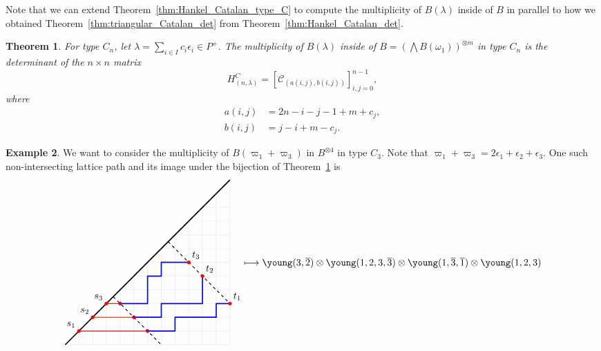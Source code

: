 \documentclass[11pt, leqno]{amsart}
\theoremstyle{plain}
\newtheorem{theorem}{Theorem}[section]
\theoremstyle{definition}
\newtheorem{example}[theorem]{Example}
\numberwithin{equation}{section}
\newcommand{\fw}{\varpi} %
\newcommand{\Cat}{\mathcal{C}} %
\newcommand{\othree}{\overline{3}}
\newcommand{\otwo}{\overline{2}}
\newcommand{\one}{\overline{1}}
\newcommand{\dyckgrid}[1]{
\foreach \i in {0, ..., #1} {\draw[gray!40, very thin] (\i,\i) -- (#1, \i); \draw[gray!40, very thin] (\i,\i) -- (\i, 0);}
}
\begin{document}
Note that we can extend Theorem~\ref{thm:Hankel_Catalan_type_C} to compute the multiplicity of $B(\lambda)$ inside of $B$ in parallel to how we obtained Theorem~\ref{thm:triangular_Catalan_det} from Theorem~\ref{thm:Hankel_Catalan_det}.

\begin{theorem}
\label{thm:triangular_Catalan_det_type_C}
For type $C_n$, let $\lambda = \sum_{i \in I} c_i \epsilon_i \in P^+$.
The multiplicity of $B(\lambda)$ inside of $B = \left( \bigwedge B(\omega_1) \right)^{\otimes m}$ in type $C_n$ is the determinant of the $n \times n$ matrix
\[
H^C_{(n,\lambda)} = \left[ \Cat_{(a(i,j),b(i,j))} \right]_{i,j=0}^{n-1},
\]
where
\begin{align*}
a(i,j) & = 2n - i - j - 1 + m + c_j,
\\ b(i,j) & = j - i + m - c_j.
\end{align*}
\end{theorem}

\begin{example}
We want to consider the multiplicity of $B(\fw_1+\fw_3)$ in $B^{\otimes 4}$ in type $C_3$. Note that $\fw_1 + \fw_3 = 2\epsilon_1 + \epsilon_2 + \epsilon_3$. One such non-intersecting lattice path and its image under the bijection of Theorem~\ref{thm:triangular_Catalan_det_type_C} is
\[
\begin{tikzpicture}[scale=0.5, baseline=82]
\dyckgrid{12}
\draw[very thick, blue, line join=round] (4,3) -- (6,3) -- (6,5) -- (7,5) -- (7,6) -- (9,6);
\draw[very thick, blue, line join=round] (5,2) -- (7,2) -- (7,3) -- (10,3) -- (10,5);
\draw[very thick, blue, line join=round] (6,1) -- (8,1) -- (8,2) -- (11,2) -- (11,3) -- (12,3);
\draw[very thick,-] (0,0) -- (12,12);
\draw[thick,dashed] (3.5,3.5) -- +(3.5, -3.5);
\draw[thick,dashed] (7.5,7.5) -- +(4.5, -4.5);
\foreach \i in {0,1,2}
{
  \draw[color=red,thick] (3-\i,3-\i) -- (3+\i+1,3-\i);
  \draw[fill=purple, color=purple] (4+\i, 3-\i) circle (0.12);
}
\foreach \i in {1,2,3}
{
  \draw[fill=red, color=red] (\i, \i) circle (0.12);
  \draw (\i, \i) node[anchor=south east] {$s_{\i}$};
}
\foreach \i in {2,3,5} { \draw[fill=red, color=red] (7+\i, 8-\i) circle (0.12); }
\draw (8+1, 8-2) node[anchor=south west] {$t_3$};
\draw (8+2, 8-3) node[anchor=south west] {$t_2$};
\draw (8+4, 8-5) node[anchor=south west] {$t_1$};
\end{tikzpicture}
\!\!\longmapsto
\young(3,\otwo) \otimes \young(1,2,3,\othree) \otimes \young(1,\othree,\one) \otimes \young(1,2,3)
\]
\end{example}
\end{document}
